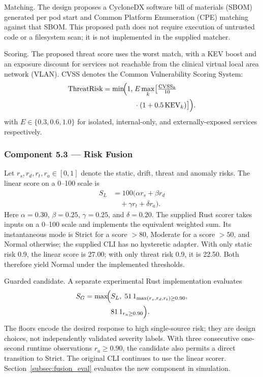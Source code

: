 \documentclass{ieeeaccess}
\renewcommand{\textbf}[1]{#1}
\begin{document}
\noindent\textbf{Matching.} The design proposes a CycloneDX software bill of materials (SBOM) generated per pod start and Common Platform Enumeration (CPE) matching against that SBOM. This proposed path does not require execution of untrusted code or a filesystem scan; it is not implemented in the supplied matcher.

\noindent\textbf{Scoring.} The proposed threat score uses the worst match, with a KEV boost and an exposure discount for services not reachable from the clinical virtual local area network (VLAN). CVSS denotes the Common Vulnerability Scoring System:
\begin{equation}
\begin{aligned}
\text{ThreatRisk} = \min\!\Bigl(1,\; &E\max_k\bigl[
\tfrac{\text{CVSS}_k}{10} \\
&{}\cdot(1 + 0.5\,\text{KEV}_k)\bigr]\Bigr).
\end{aligned}
\label{eq:threat}
\end{equation}
with $E \in \{0.3, 0.6, 1.0\}$ for isolated, internal-only, and externally-exposed services respectively.

\subsubsection{Component 5.3 --- Risk Fusion}
\label{subsubsec:fusion}

Let $r_s,r_d,r_t,r_a\in[0,1]$ denote the static, drift, threat and anomaly risks. The linear score on a 0--100 scale is
\begin{align}
S_L &= 100\bigl(\alpha r_s+\beta r_d \nonumber\\
&\quad{}+\gamma r_t+\delta r_a\bigr).
\label{eq:fusion}
\end{align}
Here $\alpha=0.30$, $\beta=0.25$, $\gamma=0.25$, and $\delta=0.20$. The supplied Rust scorer takes inputs on a 0--100 scale and implements the equivalent weighted sum. Its instantaneous mode is Strict for a score $>80$, Moderate for a score $>50$, and Normal otherwise; the supplied CLI has no hysteretic adapter. With only static risk 0.9, the linear score is 27.00; with only threat risk 0.9, it is 22.50. Both therefore yield Normal under the implemented thresholds.

\noindent\textbf{Guarded candidate.} A separate experimental Rust implementation evaluates
\begin{equation}
\begin{aligned}
S_G=\max\!\Bigl(&S_L,\;51\,\mathrm{1}_{\max(r_s,r_d,r_t)\geq0.90},\\
&81\,\mathrm{1}_{r_a\geq0.90}\Bigr).
\end{aligned}
\label{eq:guarded_fusion}
\end{equation}
The floors encode the desired response to high single-source risk; they are design choices, not independently validated severity labels. With three consecutive one-second runtime observations $r_a\geq0.90$, the candidate also permits a direct transition to Strict. The original CLI continues to use the linear scorer. Section~\ref{subsec:fusion_eval} evaluates the new component in simulation.
\end{document}
